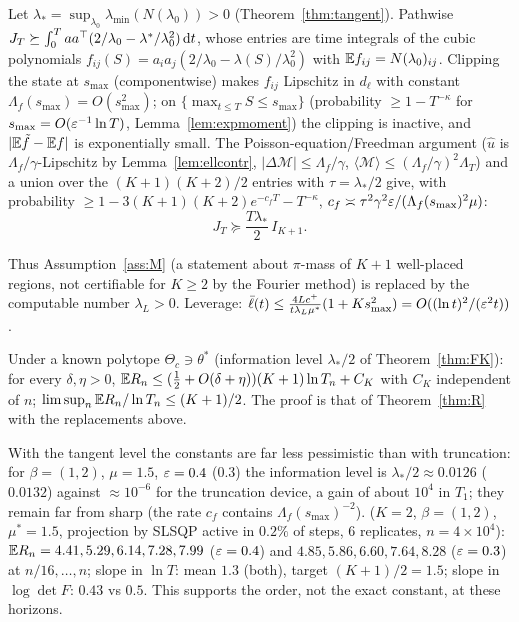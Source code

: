 \begin{theorem}\label{thm:FK}\Ps{}
Let $\lambda_*=\sup_{\lambda_0}\lambda_{\min}(N(\lambda_0))>0$ (Theorem~\ref{thm:tangent}). Pathwise $J_T\succeq\int_0^Taa^{\top}(2/\lambda_0-\lambda^*/\lambda_0^2)\,\mathrm d t$, whose entries are time integrals of the cubic polynomials $f_{ij}(S)=a_ia_j(2/\lambda_0-\lambda(S)/\lambda_0^2)$ with $\mathbb{E} f_{ij}=N(\lambda_0)_{ij}$. Clipping the state at $s_{\max}$ (componentwise) makes $f_{ij}$ Lipschitz in $d_\ell$ with constant $\Lambda_f(s_{\max})=O(s_{\max}^2)$; on $\{\max_{t\le T}S\le s_{\max}\}$ (probability $\ge1-T^{-\kappa}$ for $s_{\max}=O(\varepsilon^{-1}\ln T)$, Lemma~\ref{lem:expmoment}) the clipping is inactive, and $|\mathbb{E}\tilde f-\mathbb{E} f|$ is exponentially small. The Poisson-equation/Freedman argument ($\hat u$ is $\Lambda_f/\gamma$-Lipschitz by Lemma~\ref{lem:ellcontr}, $|\Delta\mathcal M|\le\Lambda_f/\gamma$, $\langle\mathcal M\rangle\le(\Lambda_f/\gamma)^2\Lambda_T$) and a union over the $(K+1)(K+2)/2$ entries with $\tau=\lambda_*/2$ give, with probability $\ge1-3(K+1)(K+2)e^{-c_fT}-T^{-\kappa}$, $c_f\asymp\tau^2\gamma^2\varepsilon/(\Lambda_f(s_{\max})^2\mu)$:
\[
J_T\succeq\frac{T\lambda_*}{2}\,I_{K+1}.
\]
\end{theorem}
Thus Assumption~\ref{ass:M} (a statement about $\pi$-mass of $K+1$ well-placed regions, not certifiable for $K\ge2$ by the Fourier method) is replaced by the computable number $\lambda_L>0$. Leverage: $\bar\ell(t)\le\frac{4Lc^+}{t\lambda_L\mu^*}(1+Ks_{\max}^2)=O((\ln t)^2/(\varepsilon^2t))$.

\begin{theorem}\label{thm:RK}\Ps{}
Under a known polytope $\Theta_c\ni\theta^*$ (information level $\lambda_*/2$ of Theorem~\ref{thm:FK}): for every $\delta,\eta>0$, $\mathbb{E} R_n\le(\frac12+O(\delta+\eta))(K+1)\ln T_n+C_K$ with $C_K$ independent of $n$; $\limsup_n\mathbb{E} R_n/\ln T_n\le(K+1)/2$. The proof is that of Theorem~\ref{thm:R} with the replacements above.
\end{theorem}
With the tangent level the constants are far less pessimistic than with truncation: for $\beta=(1,2)$, $\mu=1.5$, $\varepsilon=0.4$ (0.3) the information level is $\lambda_*/2\approx0.0126$ ($0.0132$) against $\approx10^{-6}$ for the truncation device, a gain of about $10^4$ in $T_1$; they remain far from sharp (the rate $c_f$ contains $\Lambda_f(s_{\max})^{-2}$). \Nt{} ($K=2$, $\beta=(1,2)$, $\mu^*=1.5$, projection by SLSQP active in $0.2\%$ of steps, 6 replicates, $n=4\times10^4$): $\mathbb{E} R_n=4.41,5.29,6.14,7.28,7.99$ ($\varepsilon=0.4$) and $4.85,5.86,6.60,7.64,8.28$ ($\varepsilon=0.3$) at $n/16,\dots,n$; slope in $\ln T$: mean $1.3$ (both), target $(K+1)/2=1.5$; slope in $\log\det F$: $0.43$ vs $0.5$. This supports the order, not the exact constant, at these horizons.

